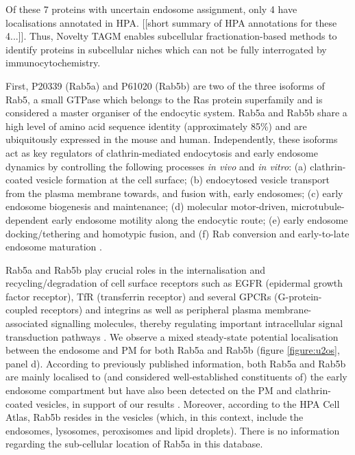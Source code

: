 \documentclass[12pt,english]{article}
\begin{document}
Of these 7 proteins with uncertain endosome assignment, only 4 have localisations annotated in HPA. [[short summary of HPA annotations for these 4...]]. Thus, Novelty TAGM enables subcellular fractionation-based methods to identify proteins in subcellular niches which can not be fully interrogated by immunocytochemistry.

First, P20339 (Rab5a) and P61020 (Rab5b) are two of the three isoforms of Rab5, a small GTPase which belongs to the Ras protein superfamily and is considered a master organiser of the endocytic system. Rab5a and Rab5b share a high level of amino acid sequence identity (approximately 85\%) and are ubiquitously expressed in the mouse and human. Independently, these isoforms act as key regulators of clathrin-mediated endocytosis and early endosome dynamics by controlling the following processes \textit{in vivo} and \textit{in vitro}: (a) clathrin-coated vesicle formation at the cell surface; (b) endocytosed vesicle transport from the plasma membrane towards, and fusion with, early endosomes; (c) early endosome biogenesis and maintenance; (d) molecular motor-driven, microtubule-dependent early endosome motility along the endocytic route; (e) early endosome docking/tethering and homotypic fusion, and (f) Rab conversion and early-to-late endosome maturation
\citep{Simonsen::1998, Zerial::2001, Rink::2005, Chen::2014, Gautreau::2014, Law::2017}.

Rab5a and Rab5b play crucial roles in the internalisation and recycling/degradation of cell surface receptors such as EGFR (epidermal growth factor receptor), TfR (transferrin receptor) and several GPCRs (G-protein-coupled receptors) and integrins as well as peripheral plasma membrane-associated signalling molecules, thereby regulating important intracellular signal transduction pathways \citep{Trischler::1999, Chen::2009, Bastin::2013, Liu::2015}. We observe a mixed steady-state potential localisation between the endosome and PM for both Rab5a and Rab5b (figure \ref{figure:u2os}, panel d). According to previously published information, both Rab5a and Rab5b are mainly localised to (and considered well-established constituents of) the early endosome compartment but have also been detected on the PM and clathrin-coated vesicles, in support of our results \citep{Simonsen::1998, Woodman::2000, Mendoza::2013}. Moreover, according to the HPA Cell Atlas, Rab5b resides in the vesicles (which, in this context, include the endosomes, lysosomes, peroxisomes and lipid droplets). There is no information regarding the sub-cellular location of Rab5a in this database.  
\end{document}
